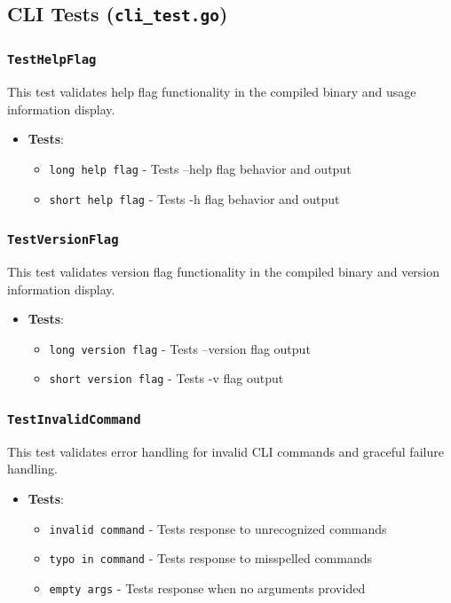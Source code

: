 \subsection{CLI Tests (\texttt{cli\_test.go})}

\subsubsection*{\texttt{TestHelpFlag}}
This test validates help flag functionality in the compiled binary and usage information display.
\begin{itemize}
    \item \textbf{Tests}:
    \begin{itemize}
        \item \texttt{long help flag} - Tests --help flag behavior and output
        \item \texttt{short help flag} - Tests -h flag behavior and output
    \end{itemize}
\end{itemize}

\subsubsection*{\texttt{TestVersionFlag}}
This test validates version flag functionality in the compiled binary and version information display.
\begin{itemize}
    \item \textbf{Tests}:
    \begin{itemize}
        \item \texttt{long version flag} - Tests --version flag output
        \item \texttt{short version flag} - Tests -v flag output
    \end{itemize}
\end{itemize}

\subsubsection*{\texttt{TestInvalidCommand}}
This test validates error handling for invalid CLI commands and graceful failure handling.
\begin{itemize}
    \item \textbf{Tests}:
    \begin{itemize}
        \item \texttt{invalid command} - Tests response to unrecognized commands
        \item \texttt{typo in command} - Tests response to misspelled commands
        \item \texttt{empty args} - Tests response when no arguments provided
    \end{itemize}
\end{itemize}


